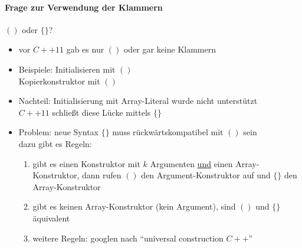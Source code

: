 \documentclass{article}
\begin{document}
\paragraph*{Frage zur Verwendung der Klammern}
	$()$ oder $\{ \}$?
	\begin{itemize}
		\item vor $C++11$ gab es nur $()$ oder gar keine Klammern
		\item Beispiele: Initialisieren mit $()$ \\
		Kopierkonstruktor mit $()$
		\item Nachteil: Initialisierung mit Array-Literal wurde nicht unterstützt \\ $C++11$ schließt diese Lücke mittels $\{ \}$
		\item Problem: neue Syntax $\{ \}$ muss rückwärtskompatibel mit $()$ sein \\ dazu gibt es Regeln:
		\begin{enumerate}
			\item gibt es einen Konstruktor mit $k$ Argumenten \underline{und} einen Array-Konstruktor, dann rufen $()$ den Argument-Konstruktor auf und $\{ \}$ den Array-Konstruktor
			\item gibt es keinen Array-Konstruktor (kein Argument), sind $()$ und $\{ \}$ äquivalent
			\item weitere Regeln: googlen nach ``universal construction $C++$''
		\end{enumerate}

	\end{itemize}
\end{document}
